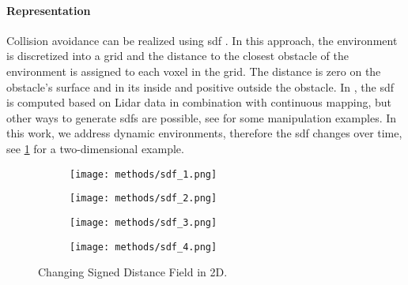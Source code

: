 \paragraph{Representation}
Collision avoidance can be realized using \ac{sdf}
\cite{Oleynikova2017voxblox}.
In this approach, the environment is discretized into a grid
and the distance to
the closest obstacle of the environment is assigned to each voxel in the grid.
The distance is zero on the
obstacle's surface and in its inside and positive outside the obstacle.
In \cite{Oleynikova2017voxblox}, the \ac{sdf} is computed
based on Lidar data in combination with continuous mapping,
but other ways to generate \acp{sdf} are possible, see
\cite{Liu2022regularized,Koptev2023neural} for some
manipulation examples.
In this work, we address dynamic environments, therefore the \ac{sdf} changes
over time, see \cref{fig:sdf} for a two-dimensional example.
%
\begin{figure}[ht]
  \centering
  \begin{subfigure}{0.25\linewidth}
    \centering
    \texttt{[image: methods/sdf\_1.png]}
  \end{subfigure}%
  \begin{subfigure}{0.25\linewidth}
    \centering
    \texttt{[image: methods/sdf\_2.png]}
  \end{subfigure}%
  \begin{subfigure}{0.25\linewidth}
    \centering
    \texttt{[image: methods/sdf\_3.png]}
  \end{subfigure}%
  \begin{subfigure}{0.25\linewidth}
    \centering
    \texttt{[image: methods/sdf\_4.png]}
  \end{subfigure}
  \caption{Changing Signed Distance Field in 2D.
  }%
  \label{fig:sdf}
\end{figure}

